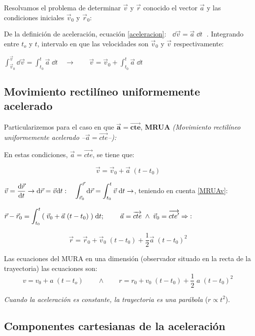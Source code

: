 Resolvamos el problema de determinar $\vec v$ y $\vec r$ conocido el vector $\vec a$ y las condiciones iniciales $\vec v_0$ y $\vec r_0$:

De la definición de aceleración, ecuación \ref{aceleracion}: $\;\;\dd \vec v= \vec a\; \dd t\;$ . Integrando entre $t_o$ y $t$, intervalo en que las velocidades son $\vec v_0$ y $\vec v$ respectivamente:

$\displaystyle \int_{\vec v_0}^{\vec v}\dd \vec v= \int_{t_0}^{t} \vec a\; \dd t \quad \to \qquad \vec v=\vec v_0+\int_{t_0}^{t} \vec a\; \dd t$

\subsection{Movimiento rectilíneo uniformemente acelerado}

Particularizemos para el caso en que $\boldsymbol{ \vec a=\overrightarrow{cte} }$, \textbf{MRUA} \emph{(Movimiento rectilíneo uniformemente acelerado --$\vec a=\overrightarrow{cte}$--):}

En estas condiciones, $\vec a=\overrightarrow{cte}$, se tiene que:

\begin{equation}
\label{MRUAv}
	\vec v=\vec v_0+\vec a\; (t-t_0)
\end{equation}

$\displaystyle \vec v=\dv{\vec r}{t} \to \dd \vec r=\vec v\dd t : \quad \int_{\vec r_0}^{\vec r}\dd \vec r=\int_{t_0}^t \vec v\;\dd t \to$, teniendo en cuenta \ref{MRUAv}:

$\displaystyle \vec r-\vec r_0=\int_{t_0}^t 
\qty(\; \vec v_0+\vec a\; (t-t_0) \;)
\; \dd t;\; \qquad \vec a=\overrightarrow{cte} \; \wedge \; \vec v_0=\overrightarrow{cte'} \Rightarrow\;:$

\begin{equation}
\label{MRUAr}
	\vec r=\vec r_0+ \vec v_0\; (t-t_0)+\dfrac 1 2 \vec a\; (t-t_0)^2
\end{equation}

Las ecuaciones del MURA en una dimensión (observador situado en la recta de la trayectoria) las ecuaciones son:
$$v=v_0+a\;(t-t_o) \qquad \wedge \qquad r=r_0+v_0\;(t-t_0)+\dfrac 1 2 \; a \; (t-t_0)^2$$

\emph{Cuando la aceleración es constante, la trayectoria es una parábola} ($r \propto t^2$).


\subsection{Componentes cartesianas de la aceleración}

